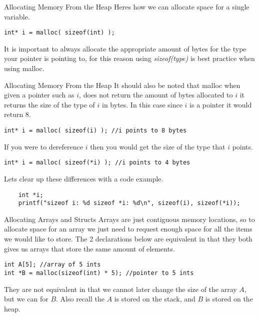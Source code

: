 \documentclass[10pt]{beamer}
\begin{document}
\begin{frame}[fragile]{Allocating Memory From the Heap}
Heres how we can allocate space for a single variable.
\begin{verbatim}
int* i = malloc( sizeof(int) );
\end{verbatim} 
It is important to always allocate the appropriate amount of bytes for the type your pointer is pointing to, for this reason using {\it sizeof(type)} is best practice when using malloc.\\

\end{frame}


\begin{frame}[fragile]{Allocating Memory From the Heap}
It should also be noted that malloc when given a pointer such as $i$, does not return the amount of bytes allocated to $i$ it returns the size of the type of $i$ in bytes. In this case since $i$ is a pointer it would return 8.
\begin{verbatim}
int* i = malloc( sizeof(i) ); //i points to 8 bytes
\end{verbatim} 
If you were to dereference $i$ then you would get the size of the type that $i$ points.
\begin{verbatim}
int* i = malloc( sizeof(*i) ); //i points to 4 bytes
\end{verbatim} 

Lets clear up these differences with a code example.
\begin{verbatim}
    int *i;
    printf("sizeof i: %d sizeof *i: %d\n", sizeof(i), sizeof(*i));
\end{verbatim} 

\end{frame}

\begin{frame}[fragile]{Allocating Arrays and Structs}
Arrays are just contiguous memory locations, so to allocate space for an array we just need to request enough space for all the items we would like to store.
The 2 declarations below are equivalent in that they both gives us arrays that store the same amount of elements.
\begin{verbatim}
int A[5]; //array of 5 ints
int *B = malloc(sizeof(int) * 5); //pointer to 5 ints
\end{verbatim}
They are not equivalent in that we cannot later change the size of the array $A$, but we can for $B$. Also recall the $A$ is stored on the stack, and $B$ is stored on the heap.
\end{frame}
\end{document}
